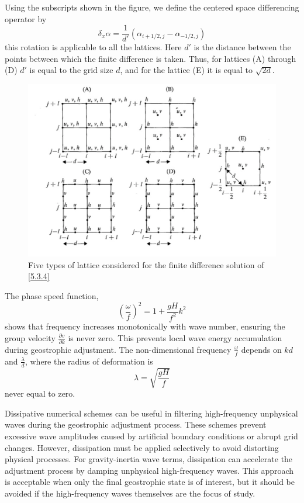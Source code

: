 Using the subscripts shown in the figure, we define the centered space differencing operator by
\begin{equation}
    \delta_x\alpha=\frac{1}{d'}\left(\alpha_{i+1/2, j}-\alpha_{-1/2,j}\right)
\end{equation}
this rotation is applicable to all the lattices. Here $d'$ is the distance between the points between which the finite difference is taken. Thus, for lattices (A) through (D) $d'$ is equal to the grid size $d$, and for the lattice (E) it is equal to $\sqrt{2d}$.\begin{figure}[h]
    \centering
    \includegraphics[width=0.5\linewidth]{uploads/Screenshot 2024-11-14 122636.png}
    \caption{Five types of lattice considered for the finite difference solution of \ref{5.3.4}}
    \label{fig:5.3.1}
\end{figure}

The phase speed function,
\begin{equation}\label{5.3.11}
    \left(\frac{\omega}{f}\right)^2=1+\frac{gH}{f^2}k^2
\end{equation}
shows that frequency increases monotonically with wave number, ensuring the group velocity  $\frac{\partial v}{\partial k}$ is never zero. This prevents local wave energy accumulation during geostrophic adjustment. The non-dimensional frequency $\frac{\omega}{f}$ depends on  $kd$ and $\frac{\lambda}{d}$, where the radius of deformation is $$\lambda=\sqrt{\frac{gH}{f}}$$ never equal to zero.


Dissipative numerical schemes can be useful in filtering high-frequency unphysical waves during the geostrophic adjustment process. These schemes prevent excessive wave amplitudes caused by artificial boundary conditions or abrupt grid changes. However, dissipation must be applied selectively to avoid distorting physical processes. For gravity-inertia wave terms, dissipation can accelerate the adjustment process by damping unphysical high-frequency waves. This approach is acceptable when only the final geostrophic state is of interest, but it should be avoided if the high-frequency waves themselves are the focus of study.


